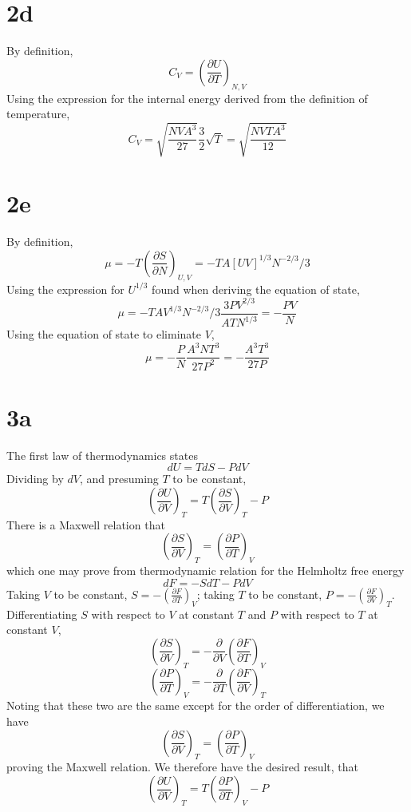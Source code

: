 \documentclass{article}
\begin{document}
\section*{2d}
By definition,
\[C_{V}=\left( \frac{\partial U}{\partial T}\right)_{N,V}\]
Using the expression for the internal energy derived from the definition of temperature,
\[C_{V}=\sqrt{\frac{NVA^{3}}{27}}\frac{3}{2}\sqrt{T}=\sqrt{\frac{NVTA^{3}}{12}}\]

\section*{2e}
By definition,
\[\mu=-T\left(  \frac{\partial S}{\partial N}\right)_{U,V}=-TA[UV]^{1/3}N^{-2/3}/3\]
Using the expression for $U^{1/3}$ found when deriving the equation of state,
\[\mu=-TAV^{1/3}N ^{-2/3}/3\frac{3PV^{2/3}}{ATN^{1/3}}=-\frac{PV}{N}\]
Using the equation of state to eliminate $V$,
\[\mu=-\frac{P}{N}\frac{A^{3}NT^{3}}{27P^{2}}=-\frac{A^{3}T^{3}}{27P}\]

\section*{3a}
The first law of thermodynamics states
\[dU=TdS-PdV\]
Dividing by $dV$, and presuming $T$ to be constant,
\[\left( \frac{\partial U}{\partial V}\right)_{T}=T\left( \frac{\partial S}{\partial V}\right)_{T}-P\]
There is a Maxwell relation that
\[\left( \frac{\partial S}{\partial V} \right)_{T}=\left( \frac{\partial P}{\partial T} \right)_{V}\]
which one may prove from thermodynamic relation for the Helmholtz free energy
\[dF=-SdT-PdV\]
Taking $V$ to be constant, $S=-\left(\frac{\partial F}{\partial T} \right)_{V}$;
taking $T$ to be constant, $P=-\left( \frac{\partial F}{\partial V} \right)_{T}$.
Differentiating $S$ with respect to $V$ at constant $T$ and $P$ with respect to $T$ at constant $V$,
\[\left( \frac{\partial S}{\partial V}\right)_{T}=-\frac{\partial}{\partial V}\left( \frac{\partial F}{\partial T} \right)_{V}\]
\[\left( \frac{\partial P}{\partial T}\right)_{V}=-\frac{\partial}{\partial T}\left( \frac{\partial F}{\partial V} \right)_{T}\]
Noting that these two are the same except for the order of differentiation, we have
\[\left( \frac{\partial S}{\partial V} \right)_{T}=\left( \frac{\partial P}{\partial T} \right)_{V}\]
proving the Maxwell relation.
We therefore have the desired result, that
\[\left( \frac{\partial U}{\partial V} \right)_{T}=T\left( \frac{\partial P}{\partial T} \right)_{V}-P\]
\end{document}
